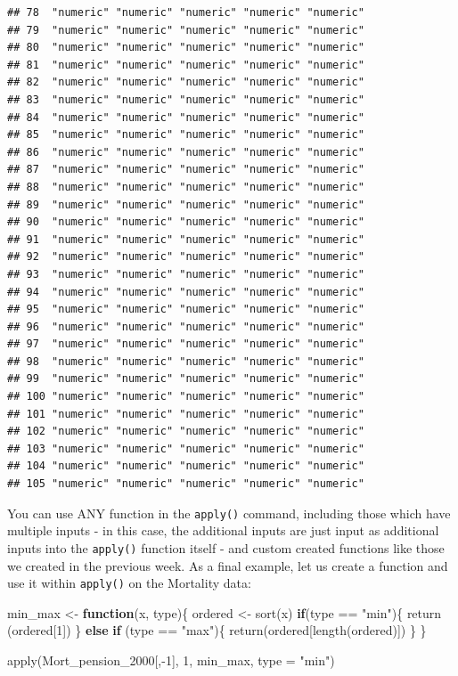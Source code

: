 \documentclass[
]{book}
\newenvironment{Shaded}{\begin{snugshade}}{\end{snugshade}}
\newcommand{\AttributeTok}[1]{\textcolor[rgb]{0.77,0.63,0.00}{#1}}
\newcommand{\ControlFlowTok}[1]{\textcolor[rgb]{0.13,0.29,0.53}{\textbf{#1}}}
\newcommand{\DecValTok}[1]{\textcolor[rgb]{0.00,0.00,0.81}{#1}}
\newcommand{\FunctionTok}[1]{\textcolor[rgb]{0.00,0.00,0.00}{#1}}
\newcommand{\NormalTok}[1]{#1}
\newcommand{\OtherTok}[1]{\textcolor[rgb]{0.56,0.35,0.01}{#1}}
\newcommand{\SpecialCharTok}[1]{\textcolor[rgb]{0.00,0.00,0.00}{#1}}
\newcommand{\StringTok}[1]{\textcolor[rgb]{0.31,0.60,0.02}{#1}}
\theoremstyle{definition}
\theoremstyle{definition}
\theoremstyle{definition}
\theoremstyle{definition}
\theoremstyle{remark}
\begin{document}
\begin{verbatim}
## 78  "numeric" "numeric" "numeric" "numeric" "numeric"
## 79  "numeric" "numeric" "numeric" "numeric" "numeric"
## 80  "numeric" "numeric" "numeric" "numeric" "numeric"
## 81  "numeric" "numeric" "numeric" "numeric" "numeric"
## 82  "numeric" "numeric" "numeric" "numeric" "numeric"
## 83  "numeric" "numeric" "numeric" "numeric" "numeric"
## 84  "numeric" "numeric" "numeric" "numeric" "numeric"
## 85  "numeric" "numeric" "numeric" "numeric" "numeric"
## 86  "numeric" "numeric" "numeric" "numeric" "numeric"
## 87  "numeric" "numeric" "numeric" "numeric" "numeric"
## 88  "numeric" "numeric" "numeric" "numeric" "numeric"
## 89  "numeric" "numeric" "numeric" "numeric" "numeric"
## 90  "numeric" "numeric" "numeric" "numeric" "numeric"
## 91  "numeric" "numeric" "numeric" "numeric" "numeric"
## 92  "numeric" "numeric" "numeric" "numeric" "numeric"
## 93  "numeric" "numeric" "numeric" "numeric" "numeric"
## 94  "numeric" "numeric" "numeric" "numeric" "numeric"
## 95  "numeric" "numeric" "numeric" "numeric" "numeric"
## 96  "numeric" "numeric" "numeric" "numeric" "numeric"
## 97  "numeric" "numeric" "numeric" "numeric" "numeric"
## 98  "numeric" "numeric" "numeric" "numeric" "numeric"
## 99  "numeric" "numeric" "numeric" "numeric" "numeric"
## 100 "numeric" "numeric" "numeric" "numeric" "numeric"
## 101 "numeric" "numeric" "numeric" "numeric" "numeric"
## 102 "numeric" "numeric" "numeric" "numeric" "numeric"
## 103 "numeric" "numeric" "numeric" "numeric" "numeric"
## 104 "numeric" "numeric" "numeric" "numeric" "numeric"
## 105 "numeric" "numeric" "numeric" "numeric" "numeric"
\end{verbatim}

You can use ANY function in the \texttt{apply()} command, including those which have multiple inputs - in this case, the additional inputs are just input as additional inputs into the \texttt{apply()} function itself - and custom created functions like those we created in the previous week. As a final example, let us create a function and use it within \texttt{apply()} on the Mortality data:

\begin{Shaded}
\begin{Highlighting}[]
\NormalTok{min\_max }\OtherTok{\textless{}{-}} \ControlFlowTok{function}\NormalTok{(x, type)\{}
\NormalTok{  ordered }\OtherTok{\textless{}{-}} \FunctionTok{sort}\NormalTok{(x)}
  \ControlFlowTok{if}\NormalTok{(type }\SpecialCharTok{==} \StringTok{"min"}\NormalTok{)\{}
    \FunctionTok{return}\NormalTok{ (ordered[}\DecValTok{1}\NormalTok{])}
\NormalTok{  \} }\ControlFlowTok{else} \ControlFlowTok{if}\NormalTok{ (type }\SpecialCharTok{==} \StringTok{"max"}\NormalTok{)\{}
    \FunctionTok{return}\NormalTok{(ordered[}\FunctionTok{length}\NormalTok{(ordered)])}
\NormalTok{  \}}
\NormalTok{\}}

\FunctionTok{apply}\NormalTok{(Mort\_pension\_2000[,}\SpecialCharTok{{-}}\DecValTok{1}\NormalTok{], }\DecValTok{1}\NormalTok{, min\_max, }\AttributeTok{type =} \StringTok{"min"}\NormalTok{)}
\end{Highlighting}
\end{Shaded}
\end{document}
